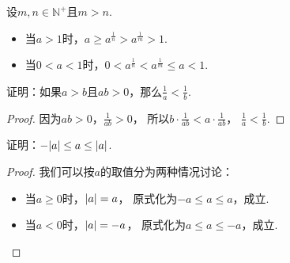 \begin{theorem}
设\(m,n\in\mathbb{N}^+\)且\(m>n\).
\begin{itemize}
	\item 当\(a>1\)时，\(a \geq a^{\frac1n} > a^{\frac1m} > 1\).
	\item 当\(0<a<1\)时，\(0 < a^{\frac1n} < a^{\frac1m} \leq a < 1\).
\end{itemize}
\end{theorem}

\begin{example}
证明：如果\(a > b\)且\(ab > 0\)，那么\(\frac{1}{a} < \frac{1}{b}\).
\begin{proof}
因为\(ab > 0\)，\(\frac{1}{ab} > 0\)，
所以\(b \cdot \frac{1}{ab} < a \cdot \frac{1}{ab}\)，
\(\frac{1}{a} < \frac{1}{b}\).
\end{proof}
\end{example}

\begin{example}
证明：\(-\abs{a} \leq a \leq \abs{a}\).
\begin{proof}
我们可以按\(a\)的取值分为两种情况讨论：
\begin{itemize}
	\item 当\(a \geq 0\)时，\(\abs{a}=a\)，
	原式化为\(-a \leq a \leq a\)，成立.
	\item 当\(a < 0\)时，\(\abs{a}=-a\)，
	原式化为\(a \leq a \leq -a\)，成立.
	\qedhere
\end{itemize}
\end{proof}
\end{example}
